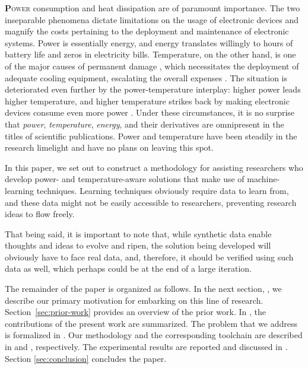 \lettrine[findent=0.4em, nindent=0em]{\textbf{P}}{ower} consumption and heat
dissipation are of paramount importance. The two inseparable phenomena dictate
limitations on the usage of electronic devices and magnify the costs pertaining
to the deployment and maintenance of electronic systems. Power is essentially
energy, and energy translates willingly to hours of battery life and zeros in
electricity bills. Temperature, on the other hand, is one of the major causes of
permanent damage \cite{jedec}, which necessitates the deployment of adequate
cooling equipment, escalating the overall expenses \cite{chaudhry2015}. The
situation is deteriorated even further by the power-temperature interplay:
higher power leads higher temperature, and higher temperature strikes back by
making electronic devices consume even more power \cite{liu2007}. Under these
circumstances, it is no surprise that \emph{power}, \emph{temperature},
\emph{energy}, and their derivatives are omnipresent in the titles of scientific
publications. Power and temperature have been steadily in the research limelight
and have no plans on leaving this spot.

In this paper, we set out to construct a methodology for assisting researchers
who develop power- and temperature-aware solutions that make use of
machine-learning techniques. Learning techniques obviously require data to learn
from, and these data might not be easily accessible to researchers, preventing
research ideas to flow freely.

That being said, it is important to note that, while synthetic data enable
thoughts and ideas to evolve and ripen, the solution being developed will
obviously have to face real data, and, therefore, it should be verified using
such data as well, which perhaps could be at the end of a large iteration.

The remainder of the paper is organized as follows. In the next section,
, we describe our primary motivation for embarking on this line
of research. Section~\ref{sec:prior-work} provides an overview of the prior
work. In , the contributions of the present work are
summarized. The problem that we address is formalized in
. Our methodology and the corresponding toolchain are
described in  and , respectively. The
experimental results are reported and discussed in .
Section \ref{sec:conclusion} concludes the paper.
